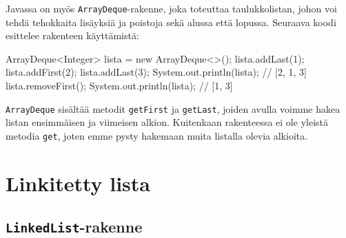 Javassa on myös \texttt{ArrayDeque}-rakenne,
joka toteuttaa taulukkolistan, johon voi tehdä tehokkaita
lisäyksiä ja poistoja sekä alussa että lopussa.
Seuraava koodi esittelee rakenteen käyttämistä:

\begin{code}
ArrayDeque<Integer> lista = new ArrayDeque<>();
lista.addLast(1);
lista.addFirst(2);
lista.addLast(3);
System.out.println(lista); // [2, 1, 3]
lista.removeFirst();
System.out.println(lista); // [1, 3]
\end{code}

\texttt{ArrayDeque} sisältää metodit \texttt{getFirst} ja
\texttt{getLast}, joiden avulla voimme hakea listan
ensimmäisen ja viimeisen alkion.
Kuitenkaan rakenteessa ei ole yleistä metodia \texttt{get},
joten emme pysty hakemaan muita listalla olevia alkioita.


\section{Linkitetty lista}

\subsection{\texttt{LinkedList}-rakenne}
